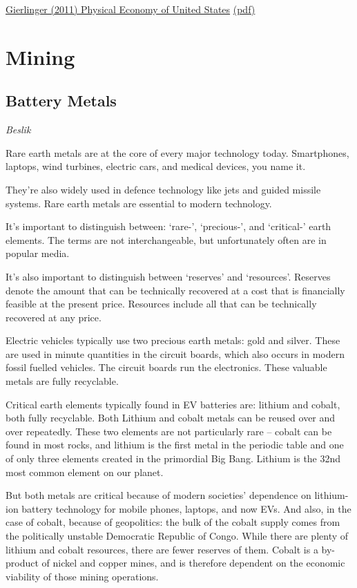\documentclass[
]{book}
\begin{document}
\href{https://onlinelibrary.wiley.com/doi/full/10.1111/j.1530-9290.2011.00404.x}{Gierlinger (2011) Physical Economy of United States}
\href{pdf/Gierlinger_2011_Physical_Economy_of_US.pdf}{(pdf)}

\hypertarget{mining}{%
\section{Mining}\label{mining}}

\hypertarget{battery-metals}{%
\subsection{Battery Metals}\label{battery-metals}}

\emph{Beslik}

Rare earth metals are at the core of every major technology today. Smartphones, laptops, wind turbines, electric cars, and medical devices, you name it.

They're also widely used in defence technology like jets and guided missile systems. Rare earth metals are essential to modern technology.

It's important to distinguish between: `rare-', `precious-', and `critical-' earth elements. The terms are not interchangeable, but unfortunately often are in popular media.

It's also important to distinguish between `reserves' and `resources'. Reserves denote the amount that can be technically recovered at a cost that is financially feasible at the present price. Resources include all that can be technically recovered at any price.

Electric vehicles typically use two precious earth metals: gold and silver. These are used in minute quantities in the circuit boards, which also occurs in modern fossil fuelled vehicles. The circuit boards run the electronics. These valuable metals are fully recyclable.

Critical earth elements typically found in EV batteries are: lithium and cobalt, both fully recyclable. Both Lithium and cobalt metals can be reused over and over repeatedly. These two elements are not particularly rare -- cobalt can be found in most rocks, and lithium is the first metal in the periodic table and one of only three elements created in the primordial Big Bang. Lithium is the 32nd most common element on our planet.

But both metals are critical because of modern societies' dependence on lithium-ion battery technology for mobile phones, laptops, and now EVs. And also, in the case of cobalt, because of geopolitics: the bulk of the cobalt supply comes from the politically unstable Democratic Republic of Congo. While there are plenty of lithium and cobalt resources, there are fewer reserves of them. Cobalt is a by-product of nickel and copper mines, and is therefore dependent on the economic viability of those mining operations.
\end{document}
